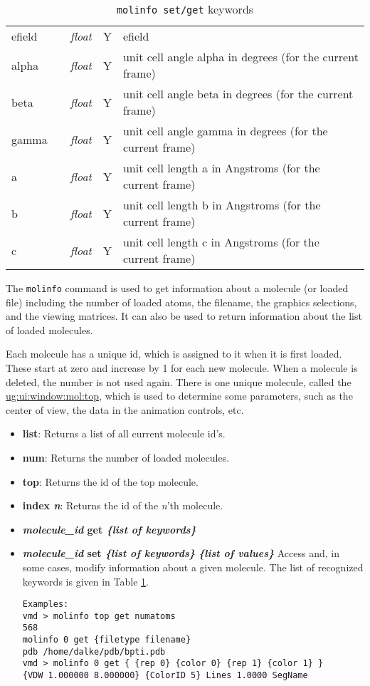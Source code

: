 \begin{table}[htp]
\begin{tabular}{|l|l|l|l|l|}
efield & & {\it float} & Y & efield \\
alpha  & & {\it float} & Y & unit cell angle alpha in degrees (for the current frame)   \\
beta   & & {\it float} & Y & unit cell angle beta in degrees (for the current frame)    \\
gamma  & & {\it float} & Y & unit cell angle gamma in degrees (for the current frame)   \\
a      & & {\it float} & Y & unit cell length a in Angstroms (for the current frame)    \\
b      & & {\it float} & Y & unit cell length b in Angstroms (for the current frame)    \\
c      & & {\it float} & Y & unit cell length c in Angstroms (for the current frame)    \\
\hline
    \end{tabular}
\caption{{\tt molinfo set/get} keywords}
\label{table:molinfo:get:keywords}
\end{table}

The {\tt molinfo} command is used to get information about a molecule
(or loaded file) including the number of loaded atoms, the
filename, the graphics selections, and the viewing matrices.  It can
also be used to return information about the list of loaded molecules.

Each molecule has a unique id, which is assigned to it when it is first loaded.
These start at zero and increase by 1 for each new molecule.  When a molecule
is deleted, the number is not used again.  There is one unique molecule, called
the \hyperref{{\sf top} molecule}{{\sf top} molecule [\S}{]}
{ug:ui:window:mol:top}, which is used to determine some parameters, such as the
center of view, the data in the animation controls, etc. 

\begin{itemize}
  \item {\bf list}: Returns a list of all current molecule id's.
  \item {\bf num}: Returns the number of loaded molecules.
  \item {\bf top}: Returns the id of the top molecule.
  \item {\bf index {\it n}}: Returns the id of the {\it n}'th molecule.
  \item {\bf {\it molecule\_id} get {\it \{list of keywords\}}}
  \item {\bf {\it molecule\_id} set {\it \{list of keywords\}} {\it \{list of values\}}}
     Access and, in some cases, modify information about a given molecule.  
The list of recognized keywords is given in Table 
\ref{table:molinfo:get:keywords}.

\begin{verbatim}
Examples:
vmd > molinfo top get numatoms
568
molinfo 0 get {filetype filename}
pdb /home/dalke/pdb/bpti.pdb
vmd > molinfo 0 get { {rep 0} {color 0} {rep 1} {color 1} }
{VDW 1.000000 8.000000} {ColorID 5} Lines 1.0000 SegName
\end{verbatim}

\end{itemize}


